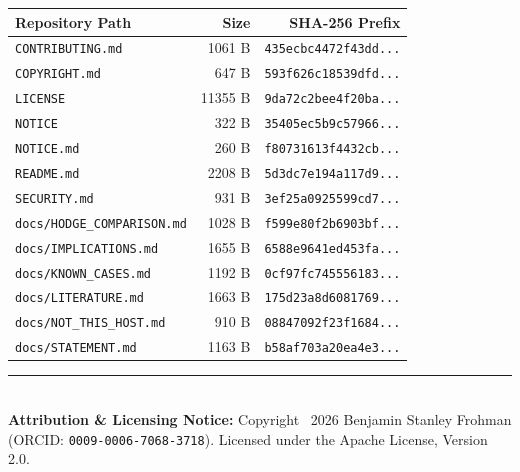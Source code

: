 \documentclass[11pt,a4paper]{article}
\begin{document}
\begin{center}
\small
\begin{tabular}{p{}rr}
\toprule
\textbf{Repository Path} & \textbf{Size} & \textbf{SHA-256 Prefix} \\
\midrule
\texttt{CONTRIBUTING.md} & 1061 B & \texttt{435ecbc4472f43dd...} \\
\texttt{COPYRIGHT.md} & 647 B & \texttt{593f626c18539dfd...} \\
\texttt{LICENSE} & 11355 B & \texttt{9da72c2bee4f20ba...} \\
\texttt{NOTICE} & 322 B & \texttt{35405ec5b9c57966...} \\
\texttt{NOTICE.md} & 260 B & \texttt{f80731613f4432cb...} \\
\texttt{README.md} & 2208 B & \texttt{5d3dc7e194a117d9...} \\
\texttt{SECURITY.md} & 931 B & \texttt{3ef25a0925599cd7...} \\
\texttt{docs/HODGE\_COMPARISON.md} & 1028 B & \texttt{f599e80f2b6903bf...} \\
\texttt{docs/IMPLICATIONS.md} & 1655 B & \texttt{6588e9641ed453fa...} \\
\texttt{docs/KNOWN\_CASES.md} & 1192 B & \texttt{0cf97fc745556183...} \\
\texttt{docs/LITERATURE.md} & 1663 B & \texttt{175d23a8d6081769...} \\
\texttt{docs/NOT\_THIS\_HOST.md} & 910 B & \texttt{08847092f23f1684...} \\
\texttt{docs/STATEMENT.md} & 1163 B & \texttt{b58af703a20ea4e3...} \\
\bottomrule
\end{tabular}
\end{center}

\vfill
\noindent\rule{\textwidth}{0.4pt}\\
\footnotesize
\textbf{Attribution \& Licensing Notice:} Copyright \textcopyright\ 2026 Benjamin Stanley Frohman (ORCID: \texttt{0009-0006-7068-3718}).
Licensed under the Apache License, Version 2.0.
\end{document}
